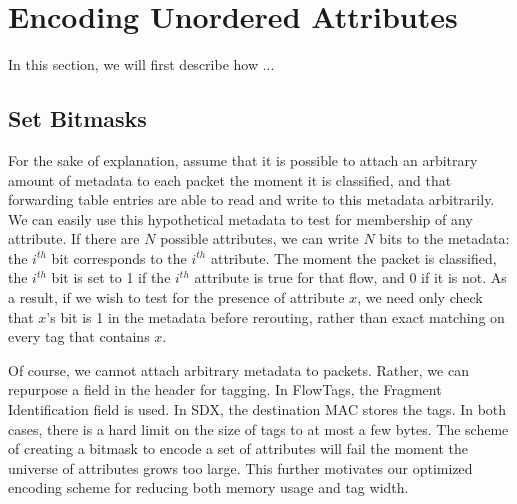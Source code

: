 \section{Encoding Unordered Attributes} 
\label{sec:flextag_encoding} 
In this section, we will first describe how ...  



\subsection{Set Bitmasks}
\label{ssec:bitmasks}
For the sake of explanation, assume that it is possible to attach an arbitrary
amount of metadata to each packet the moment it is classified, and that
forwarding table entries are able to read and write to this metadata
arbitrarily. We can easily use this hypothetical metadata to test for membership
of any attribute. If there are $N$ possible attributes, we can write $N$ bits to
the metadata: the $i^{th}$ bit corresponds to the $i^{th}$ attribute. The moment
the packet is classified, the $i^{th}$ bit is set to 1 if the $i^{th}$ attribute
is true for that flow, and 0 if it is not. As a result, if we wish to test for
the presence of attribute $x$, we need only check that $x$'s bit is 1 in the
metadata before rerouting, rather than exact matching on every tag that contains
$x$.

Of course, we cannot attach arbitrary metadata to packets. Rather, we can
repurpose a field in the header for tagging. In FlowTags, the Fragment
Identification field is used. In SDX, the destination MAC stores the tags. In
both cases, there is a hard limit on the size of tags to at most a few bytes.
The scheme of creating a bitmask to encode a set of attributes will fail the
moment the universe of attributes grows too large. This further motivates our
optimized encoding scheme for reducing both memory usage and tag width.


